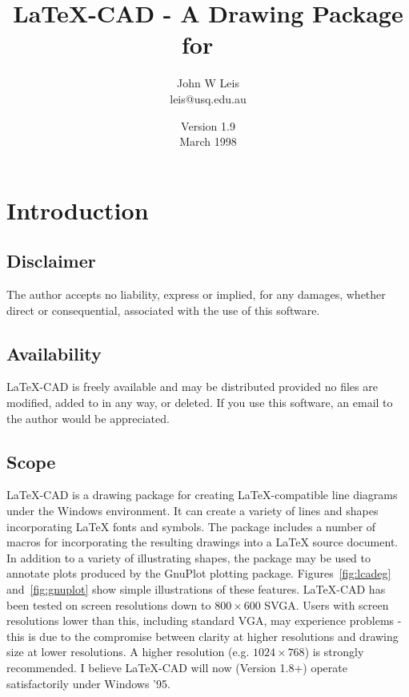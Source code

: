 \documentclass[a4paper]{article}
\begin{document}
\title{ \large\bf  \LaTeX-CAD - A Drawing Package for \LaTeXe\ }
\author{John W Leis \\ leis@usq.edu.au}
\date{Version 1.9 \\ March 1998}
\maketitle

\section{Introduction}


\subsection{Disclaimer}
The author accepts no liability, express or implied, for any
damages, whether direct or consequential, associated with the
use of this software.

\subsection{Availability}
LaTeX-CAD is freely available and may be distributed provided
no files are modified, added to in any way, or deleted.
If you use this software, an email to the author would be appreciated.

\subsection{Scope}
LaTeX-CAD is a drawing package for creating \LaTeX-compatible line
diagrams under the Windows environment. It can create a variety of
lines and shapes incorporating \LaTeX\/ fonts and symbols.
The package includes a number of macros for incorporating the
resulting drawings into a \LaTeX\/ source document. In addition to a
variety of illustrating shapes, the package may be used to annotate
plots produced by the GnuPlot plotting package. Figures~\ref{fig:lcadeg}
and~\ref{fig:gnuplot} show simple illustrations of these features.
LaTeX-CAD has been tested on screen resolutions down to $800\times 600$ SVGA.
Users with screen resolutions lower than this, including standard VGA, may
experience problems - this is due to the compromise between clarity at higher
resolutions and drawing size at lower resolutions. A higher resolution
(e.g. $1024\times 768$) is strongly recommended.
I believe LaTeX-CAD will now (Version 1.8+) operate satisfactorily under
Windows '95.
\end{document}
